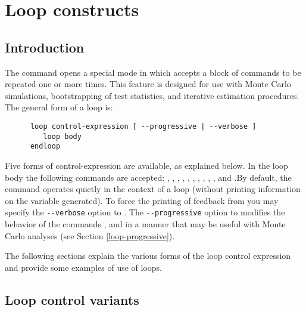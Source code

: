 \chapter{Loop constructs}
\label{looping}



\section{Introduction}
\label{loop-intro}

The command  opens a special mode in
      which  accepts a block of
      commands to be repeated one or more times.  This feature is
      designed for use with Monte Carlo simulations, bootstrapping of
      test statistics, and iterative estimation procedures. The
      general form of a loop is:
\begin{verbatim}
      loop control-expression [ --progressive | --verbose ]
         loop body
      endloop\end{verbatim}
Five forms of control-expression
      are available, as explained below.  In the loop
	body the following commands are accepted:
      , ,
      , ,
      , ,
      , ,
      , ,
       and .By default, the  command operates
      quietly in the context of a loop (without printing information
      on the variable generated).  To force the printing of feedback
      from  you may specify the
      \verb+--verbose+ option to .
    The \verb+--progressive+ option to
       modifies the behavior of the commands
      ,  and
       in a manner that may be useful with
      Monte Carlo analyses (see Section \ref{loop-progressive}).
    
      The following sections explain the various forms of the loop
      control expression and provide some examples of use of loops.

\section{Loop control variants}
\label{loop-control}



